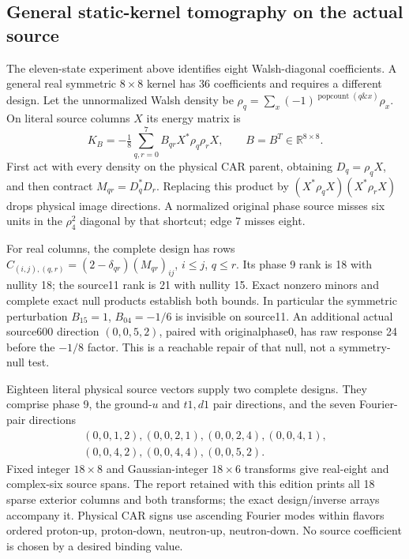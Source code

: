 \subsection{General static-kernel tomography on the actual source}
\label{sec:general-tomography-12}

The eleven-state experiment above identifies eight Walsh-diagonal
coefficients. A general real symmetric $8\times8$ kernel has 36
coefficients and requires a different design. Let the unnormalized Walsh
density be $\rho_q=\sum_x(-1)^{\operatorname{popcount}(q\mathbin{\&}x)}\rho_x$.
On literal source columns $X$ its energy matrix is
\begin{equation}
 K_B=-\tfrac18\sum_{q,r=0}^7B_{qr}X^*\rho_q\rho_rX,
 \qquad B=B^T\in\mathbb R^{8\times8}.
\end{equation}
First act with every density on the physical CAR parent, obtaining
$D_q=\rho_qX$, and then contract $M_{qr}=D_q^*D_r$.
Replacing this product by $(X^*\rho_qX)(X^*\rho_rX)$ drops physical
image directions. A normalized original phase source misses six units
in the $\rho_4^2$ diagonal by that shortcut; edge 7 misses eight.

For real columns, the complete design has rows
$C_{(i,j),(q,r)}=(2-\delta_{qr})(M_{qr})_{ij}$,
$i\le j$, $q\le r$. Its phase 9 rank is 18 with nullity 18;
the source11 rank is 21 with nullity 15. Exact nonzero minors and complete
exact null products establish both bounds. In particular the symmetric
perturbation $B_{15}=1$, $B_{04}=-1/6$ is invisible on source11.
An additional actual source600 direction $(0,0,5,2)$, paired with
originalphase0, has raw response 24 before the $-1/8$ factor. This is a
reachable repair of that null, not a symmetry-null test.

Eighteen literal physical source vectors supply two complete designs.
They comprise phase 9, the ground-$u$ and $t1,d1$ pair directions, and
the seven Fourier-pair directions
\begin{equation}
\begin{gathered}
(0,0,1,2),(0,0,2,1),(0,0,2,4),(0,0,4,1),\\
(0,0,4,2),(0,0,4,4),(0,0,5,2).
\end{gathered}
\end{equation}
Fixed integer $18\times8$ and Gaussian-integer $18\times6$ transforms
give real-eight and complex-six source spans. The report retained with
this edition prints all 18 sparse exterior columns and both transforms;
the exact design/inverse arrays accompany it. Physical CAR signs use
ascending Fourier modes within flavors ordered proton-up, proton-down,
neutron-up, neutron-down. No source coefficient is chosen by a desired
binding value.


